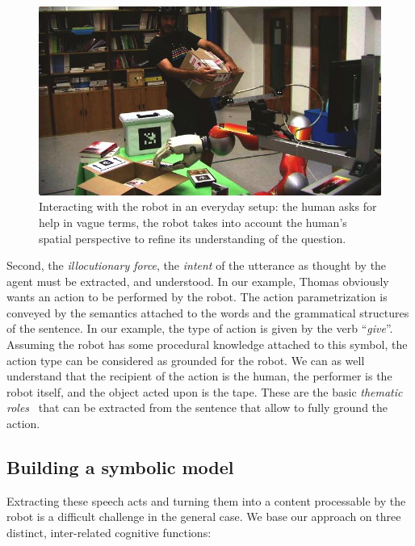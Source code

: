 \begin{figure}%
	\centering
	\includegraphics[width=0.9\linewidth]{images/dialogs/pt.jpg} 
	\caption{Interacting with
	the robot in an everyday setup: the human asks for help in vague terms, the
	robot takes into account the human's spatial perspective to refine its
	understanding of the question.} 
	\label{fig|vpt} 
\end{figure}


Second, the \emph{illocutionary force}, \ie the \emph{intent} of the utterance
as thought by the agent must be extracted, and understood. In our example,
Thomas obviously wants an action to be performed by the robot. The action
parametrization is conveyed by the semantics attached to the words and the
grammatical structures of the sentence. In our example, the type of action is
given by the verb ``\textit{give}''. Assuming the robot has some procedural
knowledge attached to this symbol, the action type can be considered as
grounded for the robot. We can as well understand that the recipient of the
action is the human, the performer is the robot itself, and the object acted
upon is the tape. These are the basic \emph{thematic roles}~\cite{Gruber1965}
that can be extracted from the sentence that allow to fully ground the action.

\subsection{Building a symbolic model}

Extracting these speech acts and turning them into a content processable by the
robot is a difficult challenge in the general case. We base our approach on
three distinct, inter-related cognitive functions:

